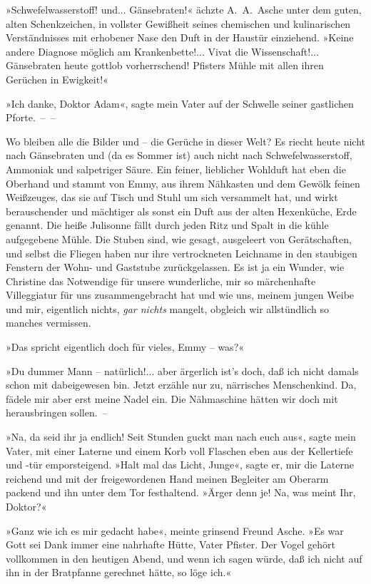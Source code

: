 »Schwefelwasserstoff! und... Gänsebraten!« ächzte A.~A.~Asche unter
dem guten, alten Schenkzeichen, in vollster Gewißheit seines
chemischen und kulinarischen Verständnisses mit erhobener Nase den
Duft in der Haustür einziehend. »Keine andere Diagnose möglich am
Krankenbette!... Vivat die Wissenschaft!... Gänsebraten heute
gottlob vorherrschend! Pfisters Mühle mit allen ihren Gerüchen in
Ewigkeit!«

»Ich danke, Doktor Adam«, sagte mein Vater auf der Schwelle seiner
gastlichen Pforte.~–~–

Wo bleiben alle die Bilder und – die Gerüche in dieser Welt? Es
riecht heute nicht nach Gänsebraten und (da es Sommer ist) auch
nicht nach Schwefelwasserstoff, Ammoniak und salpetriger Säure. Ein
feiner, lieblicher Wohlduft hat eben die Oberhand und stammt von
Emmy, aus ihrem Nähkasten und dem Gewölk feinen Weißzeuges, das sie
auf Tisch und Stuhl um sich versammelt hat, und wirkt berauschender
und mächtiger als sonst ein Duft aus der alten Hexenküche, Erde
genannt. Die heiße Julisonne fällt durch jeden Ritz und Spalt in
die kühle aufgegebene Mühle. Die Stuben sind, wie gesagt,
ausgeleert von Gerätschaften, und selbst die Fliegen haben nur ihre
vertrockneten Leichname in den staubigen Fenstern der Wohn- und
Gaststube zurückgelassen. Es ist ja ein Wunder, wie Christine das
Notwendige für unsere wunderliche, mir so märchenhafte Villeggiatur
für uns zusammengebracht hat und wie uns, meinem jungen Weibe und
mir, eigentlich nichts, \emph{gar nichts} mangelt, obgleich wir
allstündlich so manches vermissen.

»Das spricht eigentlich doch für vieles, Emmy – was?«

»Du dummer Mann – natürlich!... aber ärgerlich ist's doch, daß ich
nicht damals schon mit dabeigewesen bin. Jetzt erzähle nur zu,
närrisches Menschenkind. Da, fädele mir aber erst meine Nadel ein.
Die Nähmaschine hätten wir doch mit herausbringen sollen.~–

»Na, da seid ihr ja endlich! Seit Stunden guckt man nach euch aus«,
sagte mein Vater, mit einer Laterne und einem Korb voll Flaschen
eben aus der Kellertiefe und -tür emporsteigend. »Halt mal das
Licht, Junge«, sagte er, mir die Laterne reichend und mit der
freigewordenen Hand meinen Begleiter am Oberarm packend und ihn
unter dem Tor festhaltend. »Ärger denn je! Na, was meint Ihr,
Doktor?«

»Ganz wie ich es mir gedacht habe«, meinte grinsend Freund Asche.
»Es war Gott sei Dank immer eine nahrhafte Hütte, Vater Pfister.
Der Vogel gehört vollkommen in den heutigen Abend, und wenn ich
sagen würde, daß ich nicht auf ihn in der Bratpfanne gerechnet
hätte, so löge ich.«

